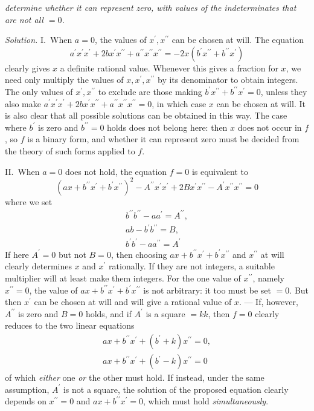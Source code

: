 \textit{determine whether it can represent zero, with values of the indeterminates that are not all \(=0\).}

\textit{Solution.} I.\ When \(a=0\), the values of \(x^\prime,x^{\prime\prime}\) can be chosen at will. The equation
\[a^\prime x^\prime x^\prime+2b x^\prime x^{\prime\prime}+a^{\prime\prime}x^{\prime\prime}x^{\prime\prime}=-2x(b^\prime x^{\prime\prime}+b^{\prime\prime}x^\prime)\]
clearly gives \(x\) a definite rational value. Whenever this gives a fraction for \(x\), we need only multiply the values of \(x,x^\prime,x^{\prime\prime}\) by its denominator to obtain integers. The only values of \(x^\prime,x^{\prime\prime}\) to exclude are those making \(b^\prime x^{\prime\prime}+b^{\prime\prime}x^\prime=0\), unless they also make \(a^\prime x^\prime x^\prime+2b x^\prime x^{\prime\prime}+a^{\prime\prime}x^{\prime\prime}x^{\prime\prime}=0\), in which case \(x\) can be chosen at will. It is also clear that all possible solutions can be obtained in this way. The case where \(b^\prime\) is zero and \(b^{\prime\prime}=0\) holds does not belong here: then \(x\) does not occur in \(f\), so \(f\) is a binary form, and whether it can represent zero must be decided from the theory of such forms applied to \(f\).

II.\ When \(a=0\) does not hold, the equation \(f=0\) is equivalent to
\[(ax+b^{\prime\prime}x^\prime+b^\prime x^{\prime\prime})^2-A^{\prime\prime}x^\prime x^\prime+2B x^\prime x^{\prime\prime}-A^\prime x^{\prime\prime}x^{\prime\prime}=0\]
where we set
\[\begin{gathered}b^{\prime\prime}b^{\prime\prime}-aa^\prime=A^{\prime\prime},\\ ab-b^\prime b^{\prime\prime}=B,\\ b^\prime b^\prime-aa^{\prime\prime}=A^\prime\end{gathered}\]
If here \(A^\prime=0\) but not \(B=0\), then choosing \(ax+b^{\prime\prime}x^\prime+b^\prime x^{\prime\prime}\) and \(x^{\prime\prime}\) at will clearly determines \(x\) and \(x^\prime\) rationally. If they are not integers, a suitable multiplier will at least make them integers. For the one value of \(x^{\prime\prime}\), namely \(x^{\prime\prime}=0\), the value of \(ax+b^{\prime\prime}x^\prime+b^\prime x^{\prime\prime}\) is not arbitrary: it too must be set \(=0\). But then \(x^\prime\) can be chosen at will and will give a rational value of \(x\). — If, however, \(A^{\prime\prime}\) is zero and \(B=0\) holds, and if \(A^\prime\) is a square \(=kk\), then \(f=0\) clearly reduces to the two linear equations
\[\begin{gathered}ax+b^{\prime\prime}x^\prime+(b^\prime+k)x^{\prime\prime}=0,\\ ax+b^{\prime\prime}x^\prime+(b^\prime-k)x^{\prime\prime}=0\end{gathered}\]
of which \textit{either} one \textit{or} the other must hold. If instead, under the same assumption, \(A^\prime\) is not a square, the solution of the proposed equation clearly depends on \(x^{\prime\prime}=0\) and \(ax+b^{\prime\prime}x^\prime=0\), which must hold \textit{simultaneously}.

